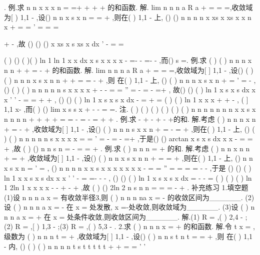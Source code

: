 . 
\textcolor{lyred}{例}.求
n
n
x
x
x
n
\infty 
=
=+
+
+
+
\sum 
\Lambda 的和函数. 
解.
lim
n
n
n
a
R
a
\rho 
+
\to \infty 
=
=\Rightarrow 
=,收敛域为[
)
1,1
-
,设()
n
n
x
s x
n
\infty 
=
=
+
\sum 
,则在(
)
1,1
-
上, 
()
()
n
n
n
n
x
xs x
xs x
x
n
x
+
\infty 
\infty 
=
=
'
=
\Rightarrow 
=
=




+
-
\sum 
\sum 
,故
()
()
()
x
xs x
s
xs x
dx
'
-
=
=




\int 
(
)
()
(
)(
)
ln 1
ln 1
x
x
dx
x
s x
x
x
x
-
=-
-
\Rightarrow 
=-
\neq 
-
\int 
,而()
s
=. 
\textcolor{lyred}{例}.求
(
)
(
)
n
n
n
x
n n
+
\infty 
+
=
-
+
\sum 
的和函数.  
解.
lim
n
n
n
a
R
a
\rho 
+
\to \infty 
=
=\Rightarrow 
=,收敛域为[
]
1,1
-
,设()
(
)
(
)
n
n
n
x
s x
n n
+
\infty 
+
=
=
-
+
\sum 
,则 
在(
)
1,1
-
上, ()
(
)
n
n
n
x
s
x
n
\infty 
+
=
'
=
-
\sum 
,
()
(
)
(
)
n
n
n
n
n
s
x
x
x
x
\infty 
\infty 
+
-
-
=
=
''
=
-
=
-
=+
\sum 
\sum 
, 
故()
()
(
)
ln 1
x
s
x
s
dx
x
x
'
'
-
=
=
+
+
\int 
, ()
()
(
)
ln 1
x
s x
s
x dx
-
=
+
=
\int 
(
)
(
)
ln 1
x
x
x
+
+
-
,
(
]
1,1
x\in -
,而(
)
()
lim
x
s
s x
+
\to -
-
=
=. 
\textcolor{lyred}{注}.
(
)
(
)
(
)
(
)
(
)
(
)
n
n
n
n
n
n
n
x
x
s
x
n n
n n
+
+
\infty 
\infty 
+
+
=
=
-
=
-
=
+
+
\sum 
\sum 
. 
\textcolor{lyred}{例}.求
-
+
-
+
-
+\Lambda 的和. 
解.考虑
(
)
n
n
n
x
n
\infty 
+
=
-
+
\sum 
,收敛域为[
]
1,1
-
,设()
(
)
n
n
n
s x
x
n
\infty 
+
=
-
=
+
\sum 
,则在(
)
1,1
-
上, 
()
(
)
(
)
n
n
n
n
n
s
x
x
x
x
\infty 
\infty 
=
=
'
=
-
=
-
=+
\sum 
\sum 
,于是()
()
arctan
x
s x
s
dx
x
x
-
=
=
+
\int 
,故 
(
)
()
n
n
s
n
\pi 
\infty 
=
-
=
=
+
\sum 
. 
\textcolor{lyred}{例}.求
(
)
n
n
n
\infty 
=
+
\sum 
的和. 
解.考虑
(
)
n
n
x
n
n
+
\infty 
=
+
\sum 
,收敛域为[
]
1,1
-
,设()
(
)
n
n
x
s x
n
n
+
\infty 
=
=
+
\sum 
,则在(
)
1,1
-
上, 
()
n
n
x
s
x
n
\infty 
=
'
=\sum 
,
()
n
n
n
n
x
x
s
x
x
x
x
x
x
x
\infty 
\infty 
-
=
=
''
=
=
=
\cdots 
=
-
-
\sum 
\sum 
,于是 
()
()
(
)
ln 1
x
x
s
x
s
dx
x
x
'
'
-
=
=-
-
-
\int 
, ()
()
(
)
ln 1
x
s x
s
x
dx
=
-
-
=
\int 
(
)
(
)
(
)
ln 1
2ln 1
x
x
x
x
-
-
+
-
+
,故
(
)
()
2ln 2
n
s
n
n
\infty 
=
=
=
-
+
\sum 
. 
\textcolor{lyred}{补充练习 }
1.填空题 
(1)设
n
n
n
a x
\infty 
=\sum 
有收敛半径3,则
(
)
n
n
n
na
x
\infty 
=
-
\sum 
的收敛区间为______. 
(2)设
(
)
n
n
n
a
x
\infty 
=
-
\sum 
在
x =
处发散,
x =-处收敛,则收敛域为______. 
(3)设
(
)
n
n
n
a
x
\infty 
=
+
\sum 
在
x =
处条件收敛,则收敛区间为______. 
解.(1)
R =
,(
)
2,4
-
;(2)
R =
,[
)
1,3
-
;(3)
R =
,(
)
5,3
-
. 
2.求
(
)
n
n
n
x
\infty 
=
+
\sum 
的和函数. 
解.令
t
x
=
,级数为
(
)
n
n
n
t
\infty 
=
+
\sum 
,收敛域为[
]
1,1
-
,设()
(
)
n
n
s t
n
t
\infty 
=
=
+
\sum 
,则 
在(
)
1,1
-
内, ()
(
)
(
)
n
n
n
n
t
s t
t
t
t
t
\infty 
\infty 
+
+
=
=
'
'




